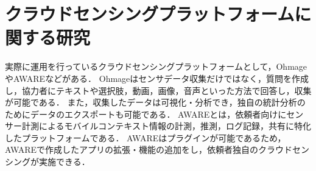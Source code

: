 \section{クラウドセンシングプラットフォームに関する研究}
\label{sec:style}
実際に運用を行っているクラウドセンシングプラットフォームとして，Ohmage\cite{Tangmunarunkit}\cite{ohmage}やAWARE\cite{Ferreira}\cite{AWARE}などがある．
Ohmageはセンサデータ収集だけではなく，質問を作成し，協力者にテキストや選択肢，動画，画像，音声といった方法で回答し，収集が可能である．
また，収集したデータは可視化・分析でき，独自の統計分析のためにデータのエクスポートも可能である．
AWAREとは，依頼者向けにセンサー計測によるモバイルコンテキスト情報の計測，推測，ログ記録，共有に特化したプラットフォームである．
AWAREはプラグインが可能であるため，AWAREで作成したアプリの拡張・機能の追加をし，依頼者独自のクラウドセンシングが実施できる．

